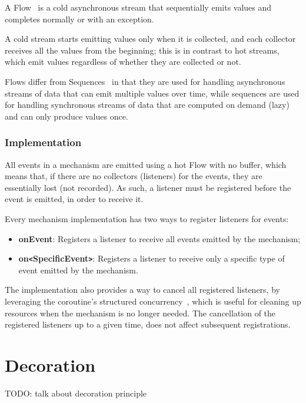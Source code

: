 A Flow~\cite{kotlin-flow} is a cold asynchronous stream that sequentially emits values and completes normally or with an exception.

A cold stream starts emitting values only when it is collected, and each collector receives all the values from the beginning; this is in contrast to hot streams, which emit values regardless of whether they are collected or not.

Flows differ from Sequences~\cite{kotlin-sequences} in that they are used for handling asynchronous streams of data that can emit multiple values over time, while sequences are used for handling synchronous streams of data that are computed on demand (lazy) and can only produce values once.

\subsubsection{Implementation}

All events in a mechanism are emitted using a hot Flow with no buffer, which means that, if there are no collectors (listeners) for the events, they are essentially lost (not recorded).
As such, a listener must be registered before the event is emitted, in order to receive it.

Every mechanism implementation has two ways to register listeners for events:

\begin{itemize}
    \item \textbf{onEvent}: Registers a listener to receive all events emitted by the mechanism;
    \item \textbf{on\texttt{<}SpecificEvent\texttt{>}}: Registers a listener to receive only a specific type of event emitted by the mechanism.
\end{itemize}

The implementation also provides a way to cancel all registered listeners, by leveraging the coroutine's structured concurrency~\cite{kotlin-coroutines}, which is useful for cleaning up resources when the mechanism is no longer needed.
The cancellation of the registered listeners up to a given time, does not affect subsequent registrations.


\section{Decoration}\label{sec:decoration}

TODO: talk about decoration principle

